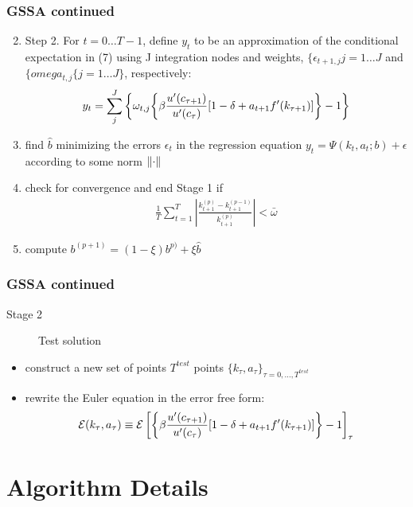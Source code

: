 \documentclass[tikz]{beamer}
\begin{document}
 \begin{frame}
   \frametitle{GSSA continued}

{\small
   \begin{enumerate}
\setcounter{enumi}{1}
 \item  Step 2. For $t = 0\ldots T − 1$, define $y_t$ to be an approximation of the conditional expectation in (7) using J integration nodes and weights, $\{\epsilon_{t+1,j}j=1\ldots J$ and $\{omega_{t,j}\{j=1\ldots J\}$, respectively:
   \begin{gather}
     y_t=\sum_j^J \left \{ \omega_{t,j}  {\left \{ \beta \frac{u^\prime(c_{\tau+1})}{u^\prime(c_{\tau})} [1- \delta + a_{t+1}f^\prime(k_{\tau+1})] \right \} -1} \right \}
   \end{gather}
 \item find $\hat{b}$ minimizing the errors $\epsilon_t$ in the regression equation $ y_{t}=\Psi(k_t,a_t;b) + \epsilon$ according to some norm $\left\lVert\cdot\right\rVert$
\item check for convergence and end Stage 1 if
  \begin{gather}
    \frac{1}{T}\sum_{t=1}^T \left | \frac{k_{t+1}^{(p)}-k_{t+1}^{(p-1)}}{k_{t+1}^{(p)}} \right | < \bar{\omega}
  \end{gather}
 \item compute $b^{(p+1)}= (1-\xi)b^{p)} + \xi \hat{b}$
   \end{enumerate}
}
 \end{frame}


 \begin{frame}
   \frametitle{GSSA continued}

{\small
   \begin{description}
\item[Stage 2]  Test solution
   \end{description}
   \begin{itemize}
\item construct a new set of points $T^{test}$ points $\{k_\tau,a_\tau\}_{\tau=0, \ldots, T^{test}}$
    \item rewrite the Euler equation in the error free form:
      \begin{gather}
        \mathcal{E}(k_\tau,a_\tau)\equiv {\mathcal{E}\left [ 
{\left \{ \beta \frac{u^\prime(c_{\tau+1})}{u^\prime(c_{\tau})} [1- \delta + a_{t+1}f^\prime(k_{\tau+1})] \right \} -1}\right ]}_\tau 
      \end{gather}
   \end{itemize}
}
 \end{frame}

\section{Algorithm Details}
\end{document}

